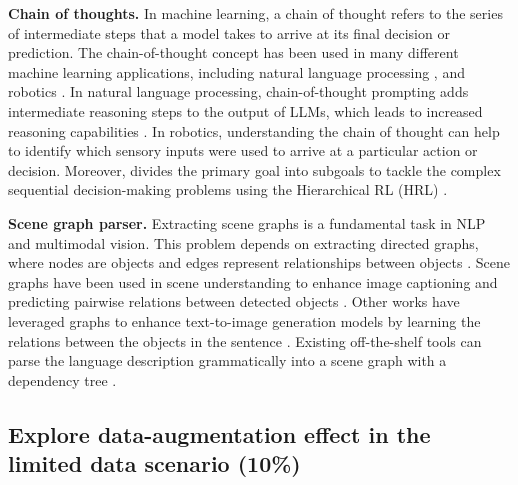 \noindent \textbf{Chain of thoughts.}
In machine learning, a chain of thought refers to the series of intermediate steps that a model takes to arrive at its final decision or prediction.
The chain-of-thought concept has been used in many different machine learning applications, including natural language processing \citep{wei2022chain, chowdhery2022palm, lyu2023faithful, wang2022self, zhang2023multimodal, madaan2022text}, and robotics \citep{jia2023chain, yang2022chain}. 
In natural language processing, chain-of-thought prompting adds intermediate reasoning steps to the output of LLMs, which leads to increased reasoning capabilities \citep{zhao_survey_2023, wei2022chain}. 
In robotics, understanding the chain of thought can help to identify which sensory inputs were used to arrive at a particular action or decision.
Moreover, \citep{jia2023chain} divides the primary goal into subgoals to tackle the complex sequential decision-making problems using the Hierarchical RL (HRL) \citep{hutsebaut2022hierarchical}.

\noindent \textbf{Scene graph parser.}
Extracting scene graphs is a fundamental task in NLP and multimodal vision. This problem depends on extracting directed graphs, where nodes are objects and edges represent relationships between objects \citep{lou2022unsupervised, xu2017scene, haowu, yongjiang, yang2018graph,schuster-etal-2015-generating}. 
Scene graphs have been used in scene understanding to enhance image captioning and predicting pairwise relations between detected objects \citep{li2017scene, dai2017detecting, li2017vipcnn}. 
Other works have leveraged graphs to enhance text-to-image generation models by learning the relations between the objects in the sentence \citep{feng2023trainingfree, johnson2018image}. 
Existing off-the-shelf tools \citep{schuster-etal-2015-generating} can parse the language description grammatically into a scene graph with a dependency tree \citep{wu2022eda}. 

\subsection{Explore data-augmentation effect in the limited data scenario (10\%)}
\label{appendix_Explore_data_augmentation}

